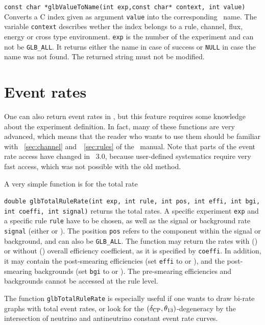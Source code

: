 \begin{function}
{\tt const char *glbValueToName(int exp,const char* context, int value)}
Converts a C index given as argument {\tt value} into the corresponding 
\AEDL\ name. The variable {\tt context} describes wether the index belongs
to a rule, channel, flux, energy or cross type environment. {\tt exp}
is the number of the experiment and can not be {\tt GLB\_ALL}. It returns
either the name in case of success or {\tt NULL} in case the name was not
found. The returned string must not be modified.
\end{function}




\section{Event rates}
\label{sec:event_rates}
One can also return event rates in \GLOBES , but this feature
requires some knowledge about the experiment definition. 
In fact, many of these functions are very advanced, which means
that the reader who wants to use them should be familiar with
\Secs~\ref{sec:channel} and~\Sec~\ref{sec:rules} of the \AEDL\ manual.
Note that parts of the event rate access have changed in \GLOBES\ 3.0,
because user-defined systematics require very fast access, which was
not possible with the old method.

A very simple function is for the total rate
\begin{function}
{\tt double glbTotalRuleRate(int exp, int rule, int pos,
int effi, int bgi, int coeffi, int signal)} returns the total rates.
A specific experiment {\tt exp} and a 
specific rule {\tt rule} have to be chosen, as well as the signal
or background rate {\tt signal} (either  or ).
The position {\tt pos} refers to the component within the signal or 
background, and can also be {\tt GLB\_ALL}. The function may return
the rates with () or without ()
overall efficiency coefficient, as it is specified by {\tt coeffi}. 
In addition, it may contain the post-smearing efficiencies (set
{\tt effi} to  or ), and the
post-smearing backgrounds (set
{\tt bgi} to  or ). The pre-smearing
efficiencies and backgrounds cannot be accessed at the rule level.
\end{function}
The function {\tt glbTotalRuleRate} is especially useful if
one wants to draw bi-rate graphs with total event rates, or look
for the $(\delta_{\mathrm{CP}},\theta_{13})$-degeneracy by the intersection of 
neutrino and antineutrino constant event rate curves.

